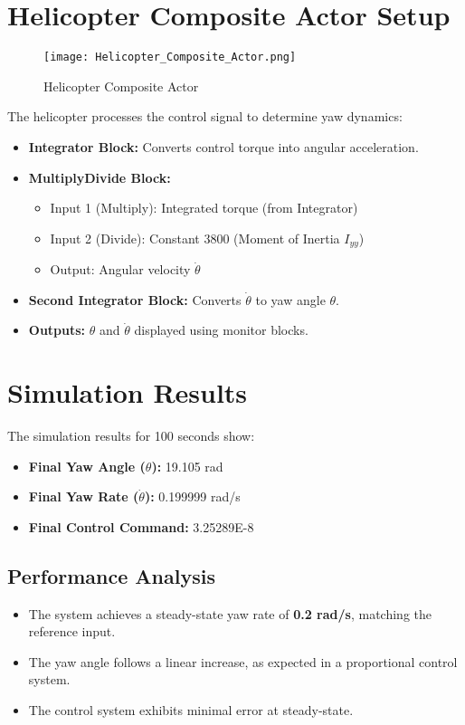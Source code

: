 \documentclass{article}
\begin{document}
\section{Helicopter Composite Actor Setup}
\begin{figure}
    \centering
    \texttt{[image: Helicopter\_Composite\_Actor.png]}
    \caption{Helicopter Composite Actor}
    \label{fig:helicopter}
\end{figure}
The helicopter processes the control signal to determine yaw dynamics:
\begin{itemize}
    \item \textbf{Integrator Block:} Converts control torque into angular acceleration.
    \item \textbf{MultiplyDivide Block:}
    \begin{itemize}
        \item Input 1 (Multiply): Integrated torque (from Integrator)
        \item Input 2 (Divide): Constant 3800 (Moment of Inertia $I_{yy}$)
        \item Output: Angular velocity $\dot{\theta}$
    \end{itemize}
    \item \textbf{Second Integrator Block:} Converts $\dot{\theta}$ to yaw angle $\theta$.
    \item \textbf{Outputs:} $\theta$ and $\dot{\theta}$ displayed using monitor blocks.
\end{itemize}

\section{Simulation Results}
The simulation results for 100 seconds show:
\begin{itemize}
    \item \textbf{Final Yaw Angle ($\theta$):} 19.105 rad
    \item \textbf{Final Yaw Rate ($\dot{\theta}$):} 0.199999 rad/s
    \item \textbf{Final Control Command:} 3.25289E-8
\end{itemize}

\subsection{Performance Analysis}
\begin{itemize}
    \item The system achieves a steady-state yaw rate of \textbf{0.2 rad/s}, matching the reference input.
    \item The yaw angle follows a linear increase, as expected in a proportional control system.
    \item The control system exhibits minimal error at steady-state.
\end{itemize}
\end{document}
